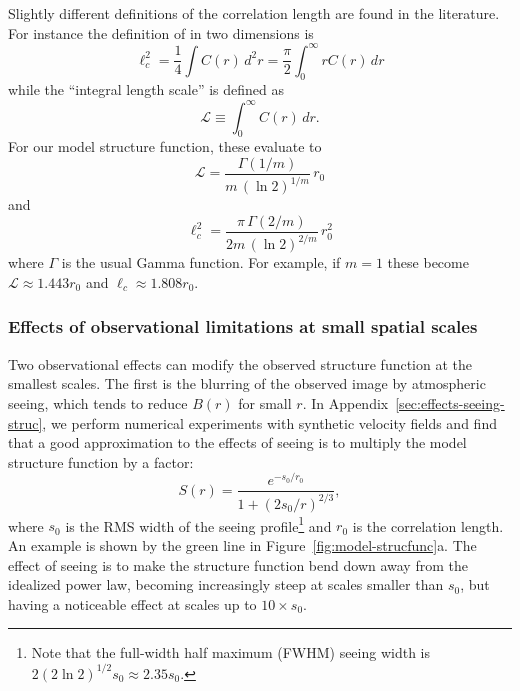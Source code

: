 \documentclass[fleqn,usenatbib, useAMS, a4paper]{mnras}
\begin{document}
\newcommand\LL{\mathcal{L}}
Slightly different definitions of the correlation length
are found in the literature.
For instance the definition of \citet{Jaupart:2022i}
in two dimensions is
\begin{equation}
  \label{eq:2}
  \ell_c^2 = \frac{1}{4} \int C(r) \, d^2 r
  = \frac{\pi}{2} \int_0^\infty r C(r) \, d r
\end{equation}
while the ``integral length scale'' \citep{Pope:2000p} is defined
as
\begin{equation}
  \label{eq:3}
  \LL \equiv \int_0^\infty C(r)\, dr .
\end{equation}
For our model structure function, these evaluate to
\begin{equation}
  \label{eq:4}
  \LL = \frac{\Gamma(1/m)}{m\, (\ln 2)^{1/m}} \, r_0
\end{equation}
and
\begin{equation}
  \label{eq:4}
   \ell_c^2 = \frac{\pi\,  \Gamma(2/m)}{2m\, (\ln 2)^{2/m}} \, r_0^2
\end{equation}
where \(\Gamma\) is the usual Gamma function.
For example, if \(m = 1\) these become \(\LL \approx 1.443 r_0\)
and \(\ell_c \approx 1.808 r_0\). 

\subsubsection{Effects of observational limitations at small spatial scales}
\label{sec:effect-observ-limit}

Two observational effects can modify the observed structure function at the smallest scales.
The first is the blurring of the observed image by atmospheric seeing,
which tends to reduce \(B(r)\) for small \(r\).
In Appendix~\ref{sec:effects-seeing-struc}, we perform numerical experiments
with synthetic velocity fields and find that
a good approximation to the effects of seeing is to multiply
the model structure function by a factor:
\begin{equation}\label{eq:ffs}
   S(r) = \frac{
    e^{-s_0 / r_0}
  }{
    1+(2s_0 / r)^{2 / 3}
  } ,
\end{equation}
where \(s_0\) is the RMS width of the seeing profile\footnote{%
  Note that the full-width half maximum (FWHM) seeing width is
  \(2 (2 \ln 2)^{1/2} s_0 \approx 2.35 s_0\).
}
and \(r_0\) is the correlation length.
An example is shown by the green line in Figure~\ref{fig:model-strucfunc}a.
The effect of seeing is to make the structure function 
bend down away from the idealized power law, 
becoming increasingly steep at scales smaller than \(s_0\),
but having a noticeable effect at scales up to \(10 \times s_0\).
\end{document}
